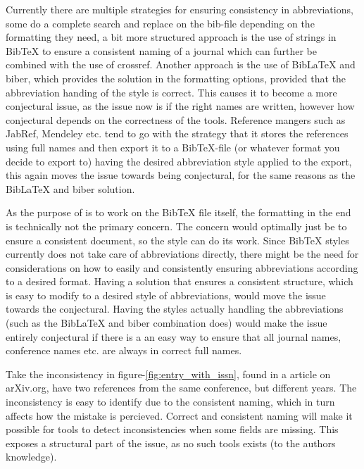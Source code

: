 Currently there are multiple strategies for ensuring consistency in
abbreviations, some do a complete search and replace on the bib-file
depending on the formatting they need, a bit more structured approach
is the use of strings in Bib{\TeX} to ensure a consistent naming of a
journal which can further be combined with the use of crossref.
Another approach is the use of Bib{\LaTeX} and biber, which provides
the solution in the formatting
options\cite{koppensteiner2011abbreviate}, provided that the
abbreviation handing of the style is correct.  This causes it to
become a more conjectural issue, as the issue now is if the right
names are written, however how conjectural depends on the correctness
of the tools.  Reference mangers such as JabRef, Mendeley etc. tend to
go with the strategy that it stores the references using full names
and then export it to a Bib{\TeX}-file (or whatever format you decide
to export to) having the desired abbreviation style applied to the
export, this again moves the issue towards being conjectural, for the
same reasons as the Bib{\LaTeX} and biber solution.

As the purpose of {\Orangutan} is to work on the Bib{\TeX} file
itself, the formatting in the end is technically not the primary
concern.  The concern would optimally just be to ensure a consistent
document, so the style can do its work.  Since Bib{\TeX} styles
currently does not take care of abbreviations directly, there might be
the need for considerations on how to easily and consistently ensuring
abbreviations according to a desired format.  Having a solution that
ensures a consistent structure, which is easy to modify to a desired
style of abbreviations, would move the issue towards the conjectural.
Having the styles actually handling the abbreviations (such as the
Bib{\LaTeX} and biber combination does) would make the issue entirely
conjectural if there is a an easy way to ensure that all journal
names, conference names etc. are always in correct full names.


Take the inconsistency in figure-\ref{fig:entry_with_issn}, found in a
article on arXiv.org, have two references from the same conference,
but different years.  The inconsistency is easy to identify due to the
consistent naming, which in turn affects how the mistake is percieved.
Correct and consistent naming will make it possible for tools to
detect inconsistencies when some fields are missing.  This exposes a
structural part of the issue, as no such tools exists (to the authors
knowledge).

